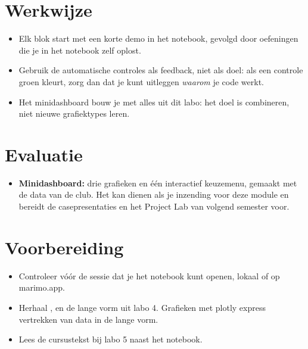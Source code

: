 \documentclass[11pt,a4paper]{article}
\begin{document}
\section{Werkwijze}

\begin{itemize}
  \item Elk blok start met een korte demo in het notebook, gevolgd door
        oefeningen die je in het notebook zelf oplost.
  \item Gebruik de automatische controles als feedback, niet als doel:
        als een controle groen kleurt, zorg dan dat je kunt uitleggen
        \emph{waarom} je code werkt.
  \item Het minidashboard bouw je met alles uit dit labo: het doel is
        combineren, niet nieuwe grafiektypes leren.
\end{itemize}

\section{Evaluatie}

\begin{itemize}
  \item \textbf{Minidashboard:} drie grafieken en één interactief
        keuzemenu, gemaakt met de data van de club. Het kan dienen als je
        inzending voor deze module en bereidt de casepresentaties en het
        Project Lab van volgend semester voor.
\end{itemize}

\section{Voorbereiding}

\begin{itemize}
  \item Controleer vóór de sessie dat je het notebook kunt openen,
        lokaal of op marimo.app.
  \item Herhaal ,  en de lange vorm uit labo 4.
        Grafieken met plotly express vertrekken van data in de lange vorm.
  \item Lees de cursustekst bij labo 5 naast het notebook.
\end{itemize}
\end{document}
